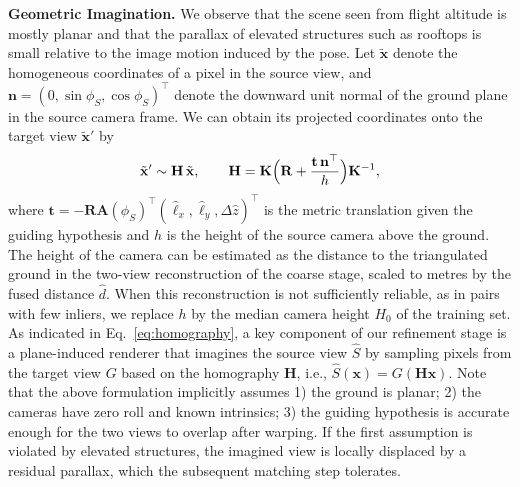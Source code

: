 \noindent\textbf{Geometric Imagination.}
We observe that the scene seen from flight altitude is mostly planar and that the parallax of elevated structures such as rooftops is small relative to the image motion induced by the pose. Let $\tilde{\mathbf{x}}$ denote the homogeneous coordinates of a pixel in the source view, and $\mathbf{n}=(0,\sin\phi_S,\cos\phi_S)^\top$ denote the downward unit normal of the ground plane in the source camera frame. We can obtain its projected coordinates onto the target view $\tilde{\mathbf{x}}'$ by
\begin{equation}
\tilde{\mathbf{x}}'\sim\mathbf{H}\,\tilde{\mathbf{x}},\qquad
\mathbf{H}=\mathbf{K}\Bigl(\mathbf{R}+\frac{\mathbf{t}\,\mathbf{n}^{\top}}{h}\Bigr)\mathbf{K}^{-1},
\label{eq:homography}
\end{equation}
where $\mathbf{t}=-\mathbf{R}\mathbf{A}(\phi_S)^\top(\hat\ell_x,\hat\ell_y,\Delta\hat z)^\top$ is the metric translation given the guiding hypothesis and $h$ is the height of the source camera above the ground. The height of the camera can be estimated as the distance to the triangulated ground in the two-view reconstruction of the coarse stage, scaled to metres by the fused distance $\hat d$. When this reconstruction is not sufficiently reliable, as in pairs with few inliers, we replace $h$ by the median camera height $H_0$ of the training set. As indicated in Eq.~\eqref{eq:homography}, a key component of our refinement stage is a plane-induced renderer that imagines the source view $\widehat{S}$ by sampling pixels from the target view $G$ based on the homography $\mathbf{H}$, i.e., $\widehat{S}(\mathbf{x})=G(\mathbf{H}\mathbf{x})$. Note that the above formulation implicitly assumes 1) the ground is planar; 2) the cameras have zero roll and known intrinsics; 3) the guiding hypothesis is accurate enough for the two views to overlap after warping. If the first assumption is violated by elevated structures, the imagined view is locally displaced by a residual parallax, which the subsequent matching step tolerates.

